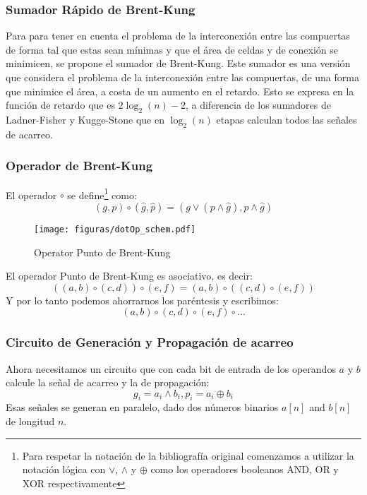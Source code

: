 


\subsubsection {Sumador Rápido de Brent-Kung}
Para para tener en cuenta el problema de la interconexión entre las compuertas de forma tal que estas sean mínimas y que el área de celdas y de conexión se minimicen, se propone el sumador de Brent-Kung. Este sumador \cite{brent-kung} es una versión que considera el problema de la interconexión entre las compuertas, de una forma que minimice el área, a costa de un aumento en el retardo. Esto se expresa en la función de retardo que es \(2\log_2(n)-2\), a diferencia de los sumadores de Ladner-Fisher\cite{ladner-fischer} y Kugge-Stone\cite{kogge-stone} que en \(\log_2(n)\) etapas calculan todos las señales de acarreo. 


\subsubsection {Operador de Brent-Kung}
El operador $\circ$ se define\footnote{ Para respetar la notación de la bibliografía original comenzamos a utilizar la notación lógica con \(\vee\), \(\wedge\) y \(\oplus\) como los operadores booleanos AND, OR y XOR respectivamente} como:
\begin{equation}
(g,p) \circ (\hat{g},\hat{p}) = (g\vee(p\wedge\hat{g}),p\wedge\hat{g})\label{gap}\end{equation}


\begin{figure}[h!]
  \centering
\texttt{[image: figuras/dotOp\_schem.pdf]}
\vspace{-5pt}
  \caption{Operator Punto de Brent-Kung}
  \label{dotOp}
\vspace{-15pt}
\end{figure}
El operador Punto de Brent-Kung es asociativo, es decir:
$$((a,b) \circ( c,d))\circ (e,f)  = (a,b)\circ((c,d)\circ(e,f))$$
Y por lo tanto podemos ahorrarnos los paréntesis y escribimos:
$$(a,b)\circ(c,d)\circ(e,f)\circ...$$

\subsubsection {Circuito de Generación y Propagación de acarreo}
Ahora necesitamos un circuito que con cada bit de entrada de los operandos \(a\) y \(b\) calcule la señal de acarreo y la de propagación:
$$g_i=a_i \wedge b_i, p_i=a_i\oplus b_i$$
Esas señales se generan en paralelo, dado dos números binarios \(a[n]\) and \(b[n]\) de longitud \(n\).

